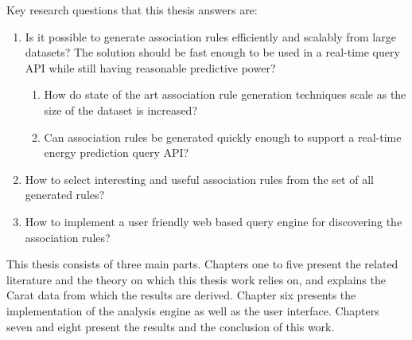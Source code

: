 Key research questions that this thesis answers are:

\begin{enumerate}
	\item Is it possible to generate association rules efficiently and scalably from large datasets? The solution should be fast enough to be used in a real-time query API while still having reasonable predictive power?
	\begin{enumerate}
		\item How do state of the art association rule generation techniques scale as the size of the dataset is increased?
		
		\item Can association rules be generated quickly enough to support a real-time energy prediction query API?
	\end{enumerate}		
	
	\item How to select interesting and useful association rules from the set of all generated rules? 
	
	\item How to implement a user friendly web based query engine for discovering the association rules? 
\end{enumerate}  


This thesis consists of three main parts. Chapters one to five present the related literature and the theory on which this thesis work relies on, and explains the Carat data from which the results are derived. Chapter six presents the implementation of the analysis engine as well as the user interface. Chapters seven and eight present the results and the conclusion of this work.


